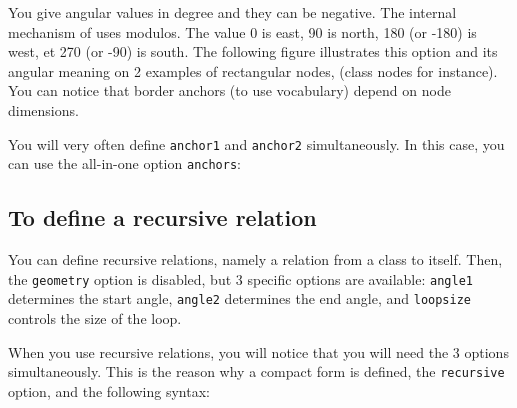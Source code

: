 \documentclass[a4paper,11pt]{report}
\begin{document}
\medskip

You give angular values in degree and they can be negative. The internal mechanism of \TikZ uses modulos. The value 0 is east, 90 is north, 180 (or -180) is west, et 270 (or -90) is south. The following figure illustrates this option and its angular meaning on 2 examples of rectangular nodes, (class nodes for instance). You can notice that border anchors (to use \TikZ vocabulary) depend on node dimensions.

\begin{center}
\end{center}

You will very often define {\tt anchor1} and {\tt anchor2} simultaneously. In this case, you can use the all-in-one option \hypertarget{anchors}{{\tt anchors}}:

\medskip

\begin{minipage}{0.6\textwidth}

\end{minipage}
\begin{minipage}{0.4\textwidth}
\begin{center}
\end{center}
\end{minipage}

\subsection{To define a recursive relation}\label{ss.relrec}

You can define recursive relations, namely a relation from a class to itself. Then, the 
{\tt geometry} option is disabled, but 3 specific options are available: {\tt angle1} determines
the start angle, {\tt angle2} determines the end angle, and {\tt loopsize} controls the size of the loop.

\medskip

\begin{minipage}{0.5\textwidth}

\end{minipage}
\begin{minipage}{0.4\textwidth}
\begin{center}
\end{center}
\end{minipage}

\medskip

When you use recursive relations, you will notice that you will need the 3 options simultaneously. This is the reason why a compact form is defined, the {\tt recursive} option, and the following syntax:
\end{document}
